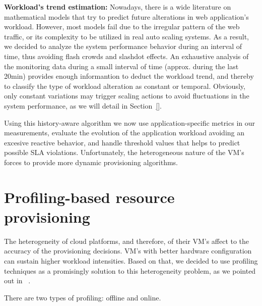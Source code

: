 \textbf{Workload's trend estimation:} Nowadays, there is a wide literature on mathematical models that try to predict future alterations in web application's workload. However, most models fail due to the irregular pattern of the web traffic, or its complexity to be utilized in real auto scaling systems. As a result, we decided to analyze the system performance behavior during an interval of time, thus avoiding flash crowds and slashdot effects. An exhaustive analysis of the monitoring data during a small interval of time (approx. during the last 20min) provides enough informantion to deduct the workload trend, and thereby to classify the type of workload alteration as constant or temporal. Obviously, only constant variations may trigger scaling actions to avoid fluctuations in the system performance, as we will detail in Section~\ref{}.

Using this history-aware algorithm we now use application-specific metrics in our measurements, evaluate the evolution of the application workload avoiding an excesive reactive behavior, and handle threshold values that helps to predict possible SLA violations. Unfortunately, the heterogeneous nature of the VM's forces to provide more dynamic provisioning algorithms. 



\section*{Profiling-based resource provisioning}

The heterogeneity of cloud platforms, and therefore, of their VM's affect to the accuracy of the provisioning decisions. VM's with better hardware configuration can sustain higher workload intensities. Based on that, we decided to use profiling techniques as a promisingly solution to this heterogeneity problem,  as we pointed out in ~\cite{jiangThesis}. 

There are two types of profiling: offline and online.

